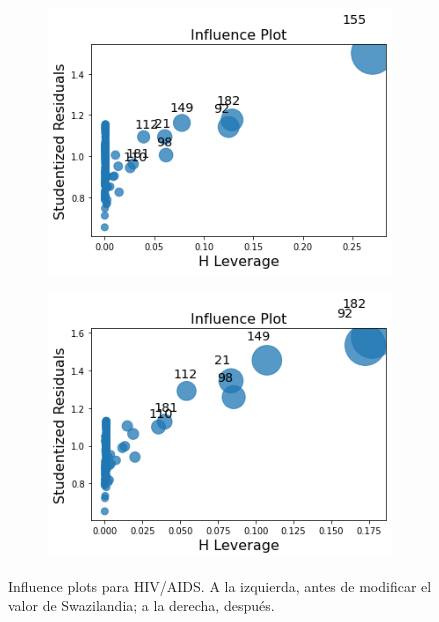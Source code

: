 \begin{figure}[H]
            \centering
              \begin{subfigure}{0.45\linewidth}
                \centering
                \includegraphics[width=\textwidth]{img/influ/hiv.png}
              \end{subfigure}
              \hfill
                \begin{subfigure}{0.45\linewidth}
                \centering
                \includegraphics[width=\textwidth]{img/influ/hiv2.png}
              \end{subfigure}
             
               \caption{Influence plots para HIV/AIDS. A la izquierda, antes de modificar el valor de Swazilandia; a la derecha, después.}
               
               \label{fig:inf_hiv}
        \end{figure}
        
